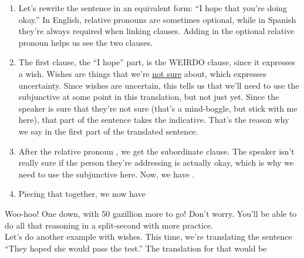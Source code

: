 \begin{enumerate}
	\item Let's rewrite the sentence in an equivalent form: ``I hope that you're doing okay.'' In English, relative pronouns are sometimes optional, while in Spanish they're always required when linking clauses. Adding in the optional relative pronoun helps us see the two clauses.
	\item The first clause, the ``I hope'' part, is the WEIRDO clause, since it expresses a wish. Wishes are things that we're \underline{not sure} about, which expresses uncertainty. Since wishes are uncertain, this tells us that we'll need to use the subjunctive at some point in this translation, but not just yet. Since the speaker is sure that they're not sure (that's a mind-boggle, but stick with me here), that part of the sentence takes the indicative. That's the reason why we say  in the first part of the translated sentence. 
	\item After the relative pronoun , we get the subordinate clause. The speaker isn't really sure if the person they're addressing is actually okay, which is why we need to use the subjunctive here. Now, we have .
	\item Piecing that together, we now have 
\end{enumerate}

Woo-hoo! One down, with 50 gazillion more to go! Don't worry. You'll be able to do all that reasoning in a split-second with more practice. \\

Let's do another example with wishes. This time, we're translating the sentence ``They hoped she would pass the test.'' The translation for that would be \\

